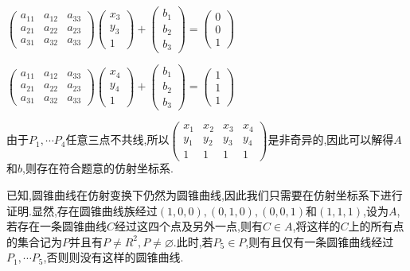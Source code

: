 \documentclass[UTF8]{book}
\begin{document}
			
			$\left(\begin{array}{lll}{a_{11}} & {a_{12}} & {a_{33}} \\ {a_{21}} & {a_{22}} & {a_{23}} \\ {a_{31}} & {a_{32}} & {a_{33}}\end{array}\right)\left(\begin{array}{l}{x_{3}} \\ {y_{3}} \\ 1\end{array}\right)+\left(\begin{array}{l}{b_{1}} \\ {b_{2}} \\ {b_{3}}\end{array}\right)=\left(\begin{array}{c}{0} \\ {0} \\ {1}\end{array}\right)$
		
		
			$\left(\begin{array}{lll}{a_{11}} & {a_{12}} & {a_{33}} \\ {a_{21}} & {a_{22}} & {a_{23}} \\ {a_{31}} & {a_{32}} & {a_{33}}\end{array}\right)\left(\begin{array}{l}{x_{4}} \\ {y_{4}} \\ 1\end{array}\right)+\left(\begin{array}{l}{b_{1}} \\ {b_{2}} \\ {b_{3}}\end{array}\right)=\left(\begin{array}{c}{1} \\ {1} \\ {1}\end{array}\right)$
			
			
			由于$ P_{1},\cdots P_{4} $任意三点不共线,所以$ \left(\begin{array}{llll}{x_{1}} & {x_{2}} & {x_{3}}& {x_{4}} \\ {y_{1}} & {y_{2}} & {y_{3}}& {y_{4}} \\ 1 & 1 & 1& 1\end{array}\right) $是非奇异的,因此可以解得$ A $和$ b $,则存在符合题意的仿射坐标系.
			
			
			已知,圆锥曲线在仿射变换下仍然为圆锥曲线,因此我们只需要在仿射坐标系下进行证明.显然,存在圆锥曲线族经过$ (1,0,0),(0,1,0),(0,0,1) $和$ (1,1,1) $,设为$ A $,若存在一条圆锥曲线$ C $经过这四个点及另外一点,则有$ C \in A $,将这样的$ C $上的所有点的集合记为$ P $并且有$ P \not = R^{2},P \not = \varnothing $.此时,若$ P_{5} \in P$,则有且仅有一条圆锥曲线经过$ P_{1},\cdots P_{5} $,否则则没有这样的圆锥曲线.
\end{document}
